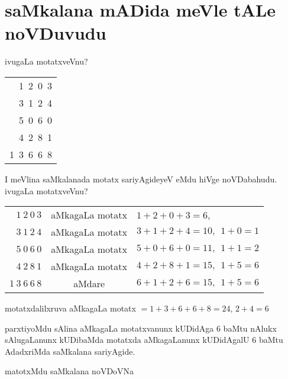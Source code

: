 \chapter{saMkalana mADida meVle tALe noVDuvudu}

\qquad ivugaLa motatxveVnu?

\begin{tabular}{r}
{\rm 1~2~0~3}\\
{\rm 3~1~2~4}\\
{\rm 5~0~6~0}\\
{\rm 4~2~8~1}\\\cline{1-1}
{\rm 1~3~6~6~8}
\end{tabular}

\smallskip

I meVlina saMkalanada motatx sariyAgideyeV eMdu hiVge noVDabahudu. ivugaLa motatxveVnu?

\smallskip

\begin{tabular}{rcl}
$1~ 2~ 0~  3$ & aMkagaLa motatx & $1+2+0+3=6$,\\
$3~1~2~4$ & aMkagaLa motatx & $3+1+2+4=10,~~ 1+0=1$\\
$5~0~6~0$ & aMkagaLa motatx & $5+0+6+0=11, ~~ 1+1=2$\\
$4~2~8~1$ & aMkagaLa motatx & $4+2+8+1=15, ~~ 1+5=6$\\\cline{1-1}\cline{3-3}
$1~3~6~6~8$ & aMdare & $6+1+2+6=15,~~ 1+5=6$ 
\end{tabular}

\smallskip

motatxdalilxruva aMkagaLa motatx $= 1+3+6+6+8=24$, $2+4=6$


parxtiyoMdu sAlina aMkagaLa motatxvanunx kUDidAga $6$ baMtu nAlukx sAlugaLanunx kUDibaMda motatxda aMkagaLanunx kUDidAgalU $6$ baMtu AdadxriMda saMkalana sariyAgide.

\eject



matotxMdu saMkalana noVDoVNa

\smallskip

{\fontsize{11}{13}}

